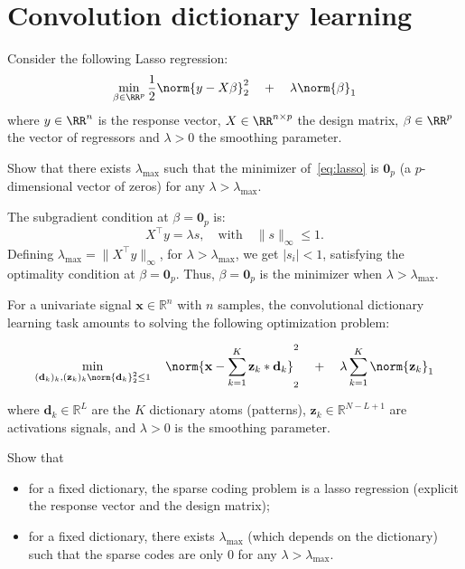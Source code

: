 \documentclass[11pt]{article}
\begin{document}
\section{Convolution dictionary learning}

\begin{exercise}
Consider the following Lasso regression:
\begin{equation}\label{eq:lasso}
    \min_{\beta\in\RR^p} \frac{1}{2}\norm{y-X\beta}^2_2 \quad + \quad \lambda \norm{\beta}_1
\end{equation}
where $y\in\RR^n$ is the response vector, $X\in\RR^{n\times p}$ the design matrix, $\beta\in\RR^p$ the vector of regressors and $\lambda>0$ the smoothing parameter.

Show that there exists $\lambda_{\max}$ such that the minimizer of~\eqref{eq:lasso} is $\mathbf{0}_p$ (a $p$-dimensional vector of zeros) for any $\lambda > \lambda_{\max}$. 
\end{exercise}

\begin{solution}  %

The subgradient condition at \(\beta = \mathbf{0}_p\) is:
\[
X^\top y = \lambda s, \quad \text{with} \quad \| s \|_\infty \leq 1.
\]
Defining \(\lambda_{\max} = \| X^\top y \|_\infty\), for \(\lambda > \lambda_{\max}\), we get \(| s_i | < 1\), satisfying the optimality condition at \(\beta = \mathbf{0}_p\). Thus, \(\beta = \mathbf{0}_p\) is the minimizer when \(\lambda > \lambda_{\max}\).

\end{solution}

\begin{exercise}
For a univariate signal $\mathbf{x}\in\mathbb{R}^n$ with $n$ samples, the convolutional dictionary learning task amounts to solving the following optimization problem:

\begin{equation}
\min_{(\mathbf{d}_k)_k, (\mathbf{z}_k)_k \\ \norm{\mathbf{d}_k}_2^2\leq 1} \quad\norm{\mathbf{x} - \sum_{k=1}^K \mathbf{z}_k * \mathbf{d}_k }^2_2 \quad + \quad\lambda \sum_{k=1}^K \norm{\mathbf{z}_k}_1
\end{equation}

where $\mathbf{d}_k\in\mathbb{R}^L$ are the $K$ dictionary atoms (patterns), $\mathbf{z}_k\in\mathbb{R}^{N-L+1}$ are activations signals, and $\lambda>0$ is the smoothing parameter.

Show that
\begin{itemize}
    \item for a fixed dictionary, the sparse coding problem is a lasso regression (explicit the response vector and the design matrix);
    \item for a fixed dictionary, there exists $\lambda_{\max}$ (which depends on the dictionary) such that the sparse codes are only 0 for any $\lambda > \lambda_{\max}$. 
\end{itemize}
\end{exercise}
\end{document}
